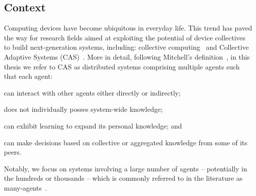 \documentclass[12pt]{article}
\begin{document}
\subsection{Context}
Computing devices have become ubiquitous in everyday life.
%
This trend has paved the way for research fields aimed at exploiting
 the potential of device collectives to build next-generation systems, 
 including: collective computing~\cite{DBLP:journals/computer/Abowd16}
 and Collective Adaptive Systems (CAS)~\cite{DBLP:journals/sttt/WirsingJN23,robyphdthesis}.
%
More in detail, following Mitchell's definition~\cite{DBLP:conf/metacognition/Mitchell05}, 
 in this thesis we refer to CAS as distributed systems comprising multiple agents 
 such that each agent:
 \begin{enumerate*}[label=(\roman*)]
	\item can interact with other agents either directly or indirectly;
	\item does not individually posses system-wide knowledge;
	\item can exhibit learning to expand its personal knowledge; and
	\item can make decisions based on collective or aggregated knowledge from some of its peers.
 \end{enumerate*}
%
Notably, we focus on systems involving a large number of agents -- potentially in the hundreds
 or thousands -- which is commonly referred to in the literature 
 as many-agents~\cite{DBLP:phd/ethos/Yang21a}.
\end{document}
